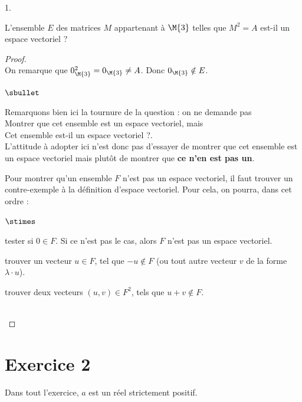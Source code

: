 \begin{noliste}{1.}
\item L'ensemble $E$ des matrices $M$ appartenant à $\M{3}$ telles que
  $M^2=A$ est-il un espace vectoriel ?

  \begin{proof}~\\
    On remarque que $0_{\M{3}}^2=0_{\M{3}}\neq A$. Donc $0_{\M{3}}
    \notin E$.%
    \begin{remark}
 \begin{noliste}{$\sbullet$}
  \item Remarquons bien ici la tournure de la question : on ne 
  demande pas\\ 
  \og Montrer que cet ensemble est un espace vectoriel\fg{}, mais \\
  \og Cet ensemble est-il un espace vectoriel ?\fg{}.\\
  L'attitude à adopter ici n'est donc pas d'essayer de montrer que cet 
  ensemble est un espace vectoriel mais plutôt de montrer que {\bf ce 
  n'en est pas un}.
  
  \item Pour montrer qu'un ensemble $F$ n'est pas un espace vectoriel, 
  il faut trouver un contre-exemple à la définition d'espace vectoriel. 
  Pour cela, on pourra, dans cet ordre :
  \begin{noliste}{$\stimes$}
    \item tester si $0\in F$. Si ce n'est pas le cas, alors $F$ n'est 
    pas un espace vectoriel.
    \item trouver un vecteur $u\in F$, tel que $-u\notin F$
    (ou tout autre vecteur $v$ de la forme $\lambda \cdot u$).
    \item trouver deux vecteurs $(u,v)\in F^2$, tels que $u+v\notin 
    F$.
  \end{noliste}
 \end{noliste}
\end{remark}~\\[-1.4cm]
\end{proof}
\end{noliste}




\newpage




\section*{Exercice 2}
\noindent
Dans tout l'exercice, $a$ est un réel strictement positif.

